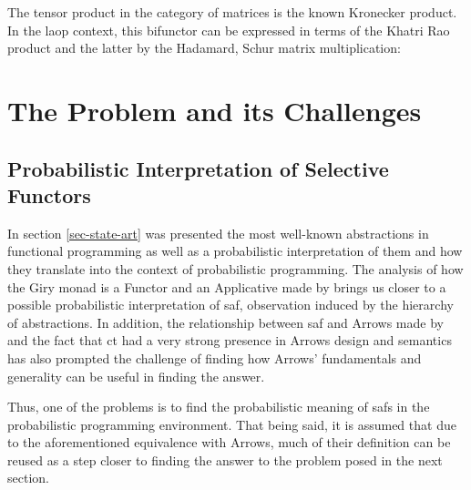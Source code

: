 \documentclass[
  oneside,
  11pt, a4paper,
  footinclude=true,
  headinclude=true,
  cleardoublepage=empty
]{scrbook}
\theoremstyle{definition}
\theoremstyle{definition}
\begin{document}
        The tensor product in the category of matrices is the known Kronecker product. In the \gls{laop} context, this bifunctor can be expressed in terms of the Khatri Rao product and the latter by the Hadamard, Schur matrix multiplication:
    
        \begin{center}
        \end{center}{}
        
    
	\chapter{The Problem and its Challenges}\label{ch-problem}
	
	\section{Probabilistic Interpretation of Selective Functors}
	
	In section \ref{sec-state-art} was presented the most well-known abstractions in functional programming as well as a probabilistic interpretation of them and how they translate into the context of probabilistic programming. The analysis of how the Giry monad \citep{giry1982} is a Functor and an Applicative made by \cite{jtobin} brings us closer to a possible probabilistic interpretation of \gls{saf}, observation induced by the hierarchy of abstractions. In addition, the relationship between \gls{saf} and Arrows made by \cite{andrey2019selective} and the fact that \gls{ct} had a very strong presence in Arrows design and semantics has also prompted the challenge of finding how Arrows' fundamentals and generality can be useful in finding the answer.
	
	Thus, one of the problems is to find the probabilistic meaning of \glspl{saf} in the probabilistic programming environment. That being said, it is assumed that due to the aforementioned equivalence with Arrows, much of their definition can be reused as a step closer to finding the answer to the problem posed in the next section.
\end{document}
